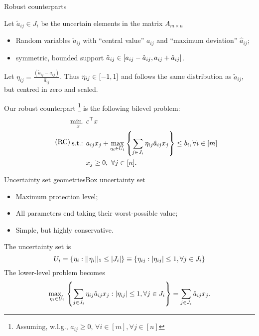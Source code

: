 \begin{frame}{Robust counterparts}

	Let $\tilde{a}_{ij} \in J_i$ be the \alert{uncertain elements} in the matrix $A_{m \times n}$ 
	\vspace{-6pt}
	\begin{itemize}
		\item Random variables $\tilde{a}_{ij}$ with ``central value'' $a_{ij}$ and ``maximum deviation'' $\hat{a}_{ij}$;
		\item symmetric, bounded support $\tilde{a}_{ij} \in \left[ a_{ij} - \hat{a}_{ij} , a_{ij} + \hat{a}_{ij} \right]$.
	\end{itemize}
	
	\pause
	Let $\eta_{ij} = \frac{(\tilde{a}_{ij} - a_{ij})}{\hat{a}_{ij}}$. Thus $\eta_{ij} \in \left[ -1,1 \right]$ and follows the \alert{same distribution} as $\tilde{a}_{ij}$, but centred in zero and scaled. 
 	
 	\pause
	Our \alert{robust counterpart}%
	\footnote{Assuming, w.l.g., $a_{ij} \ge 0$, $\forall i \in [m], \forall j \in [n]$}
	 is the following \alert{bilevel} problem:
	\begin{equation} \tag{RC}
		\begin{aligned}
			\mathop{\text{min.} \ }_x & c^\top x \\
			\text{s.t.: } & a_{ij}x_j + \max_{\eta_i \in U_i} \left\{ \sum_{j \in J_i}\eta_{ij}\hat{a}_{ij}x_j \right \} \le b_i, \forall i \in [m] \\
			& x_j \ge 0, \ \forall j \in [n].			
		\end{aligned}
	\end{equation}
\end{frame}

\begin{frame}{Uncertainty set geometries}{Box uncertainty set \cite{soyster1973convex}}
	\begin{itemize}
		\item \alert{Maximum} protection level;
		\item All parameters end taking their worst-possible value;
		\item Simple, but highly conservative.
	\end{itemize}

	The \alert{uncertainty set} is
	$$
		U_i = \left\{ \eta_i : ||\eta_i||_1 \le |J_i| \right \} \equiv \left\{ \eta_{ij} : |\eta_{ij}| \le 1, \forall j \in J_i \right \}
	$$
	\pause
	The \alert{lower-level problem} becomes
	\begin{equation*}
		\mathop{\text{max.} \ }_{\eta_i \in U_i}\left\{ \sum_{j \in J_i} \eta_{ij}\hat{a}_{ij}x_j : |\eta_{ij}| \le 1, \forall j \in J_i \right \} = \sum_{j \in J_i}\hat{a}_{ij}x_j.
	\end{equation*}	

\end{frame}

